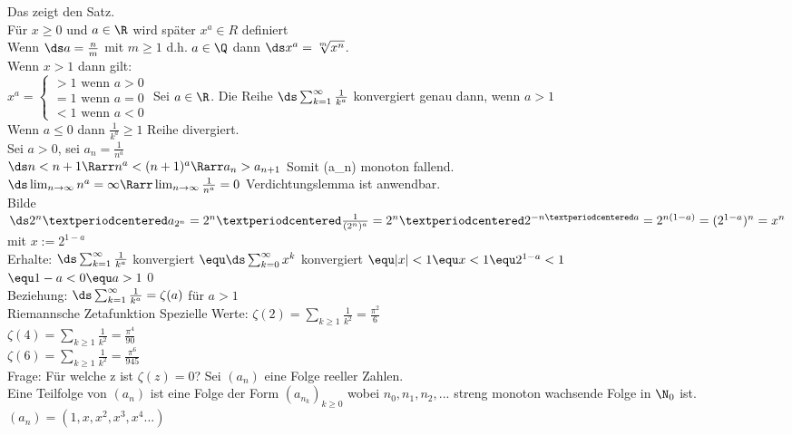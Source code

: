 Das zeigt den Satz.\\
    Für $ x\geq 0$ und $a \in \R$ wird später $x^a \in R$ definiert\\
    Wenn $\ds a = \frac{n}{m}$ mit $m \geq 1$ d.h. $a \in \Q$ dann $\ds x^a = \sqrt[m]{x^n}$.\\
    Wenn $x > 1$ dann gilt: \\
    $x^a = \begin{cases} >1 \mbox{ wenn }a>0\\ =1 \mbox{ wenn }a=0\\ <1\mbox{ wenn }a<0 \end{cases}$
%
Sei $a \in \R$. Die Reihe $\ds \sum_{k=1}^{\infty} \frac{1}{k^a}$ konvergiert genau dann, wenn $a > 1$\\
\bew
Wenn $a \leq 0$ dann $\frac{1}{k^a} \geq 1$ \Rarr Reihe divergiert.\\
Sei $a >0$, sei $a_n = \frac{1}{n^a}$ \\
$\ds n < n+1 \Rarr n^a < (n+1)^a \Rarr a_n > a_{n+1}$ Somit (a_n) monoton fallend.\\
$\ds \lim_{n\to \infty} n^a = \infty \Rarr \lim_{n \to \infty} \frac{1}{n^a} = 0$ \Rarr Verdichtungslemma ist anwendbar.\\
Bilde $\ds 2^n · a_{2^n} = 2^n · \frac{1}{(2^n)^a} = 2^n · 2^{-n · a} = 2^{n(1-a)} = (2^{1-a})^n = x^n$\\
mit $x:=2^{1-a}$\\
Erhalte:
$\ds \sum_{k=1}^\infty \frac{1}{k^a}$ konvergiert $\equ \ds \sum_{k=0}^\infty x^k$ konvergiert $\equ |x|<1 \equ x<1 \equ 2^{1-a} <1$\\
$\equ 1-a<0 \equ a>1$\qed\\[4pt]
Beziehung:
$\ds \sum_{k=1}^\infty\frac{1}{k^a}=\zeta (a)$ für $a>1$\\
Riemannsche Zetafunktion
Spezielle Werte:
$\zeta (2) = \sum_{k\geq1}\frac{1}{k^2}=\frac{\pi^2}{6}$\\
$\zeta (4) = \sum_{k\geq1}\frac{1}{k^2}=\frac{\pi^4}{90}$\\
$\zeta (6) = \sum_{k\geq1}\frac{1}{k^2}=\frac{\pi^6}{945}$\\
Frage: Für welche z ist $\zeta(z)=0$?
%
Sei $(a_n)$ eine Folge reeller Zahlen.\\
Eine Teilfolge von $(a_n)$ ist eine Folge der Form $(a_{n_k})_{k \geq 0}$ wobei $n_0, n_1, n_2,...$ streng monoton wachsende Folge in $\N_0$ ist.\\
\bsp
$(a_n) = (1, x, x^2, x^3 , x^4 ...)$\\
